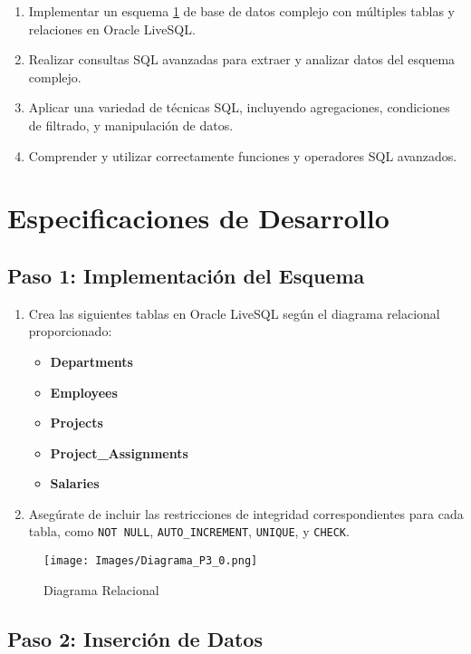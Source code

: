 \begin{enumerate}
\item Implementar un esquema \ref{fig:diagramaP3_1} de base de datos complejo con múltiples tablas y relaciones en Oracle LiveSQL.
\item Realizar consultas SQL avanzadas para extraer y analizar datos del esquema complejo.
\item Aplicar una variedad de técnicas SQL, incluyendo agregaciones, condiciones de filtrado, y manipulación de datos.
\item Comprender y utilizar correctamente funciones y operadores SQL avanzados.
\end{enumerate}

\section*{Especificaciones de Desarrollo}

\subsection*{Paso 1: Implementación del Esquema}

\begin{enumerate}
    \item Crea las siguientes tablas en Oracle LiveSQL según el diagrama relacional proporcionado:
    \begin{itemize}
        \item \textbf{Departments}
        \item \textbf{Employees}
        \item \textbf{Projects}
        \item \textbf{Project\_Assignments}
        \item \textbf{Salaries}
    \end{itemize}
    \item Asegúrate de incluir las restricciones de integridad correspondientes para cada tabla, como \texttt{NOT NULL}, \texttt{AUTO\_INCREMENT}, \texttt{UNIQUE}, y \texttt{CHECK}.
\end{enumerate}
\begin{figure}[h]
    \centering
    \texttt{[image: Images/Diagrama\_P3\_0.png]}
    \caption{Diagrama Relacional}
    \label{fig:diagramaP3_1}
\end{figure}


\subsection*{Paso 2: Inserción de Datos}

